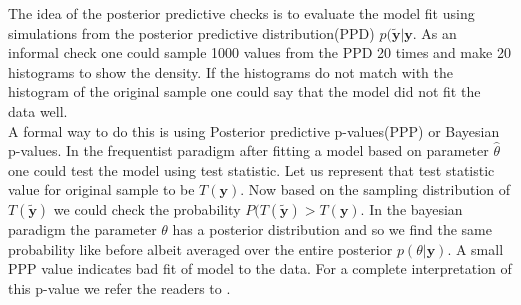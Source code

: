 The idea of the posterior predictive checks is to evaluate the model fit using simulations from the posterior predictive distribution(PPD) $p(\boldsymbol{\tilde{y}}|\boldsymbol{y}$. As an informal check one could sample 1000 values from the PPD 20 times and make 20 histograms to show the density. If the histograms do not match with the histogram of the original sample one could say that the model did not fit the data well.\\ 
A formal way to do this is using Posterior predictive p-values(PPP) or Bayesian p-values. In the frequentist paradigm after fitting a model based on parameter $\hat{\theta}$ one could test the model using test statistic. Let us represent that test statistic value for original sample to be $T(\boldsymbol{y})$. Now based on the sampling distribution of $T(\boldsymbol{\tilde{y}})$ we could check the probability $P(T(\boldsymbol{\tilde{y}}) > T(\boldsymbol{y})$. In the bayesian paradigm the parameter $\theta$ has a posterior distribution and so we find the same probability like before albeit averaged over the entire posterior $p(\theta|\boldsymbol{y})$. A small PPP value indicates bad fit of model to the data. For a complete interpretation of this p-value we refer the readers to \citet{gelman_understanding_2012}.
